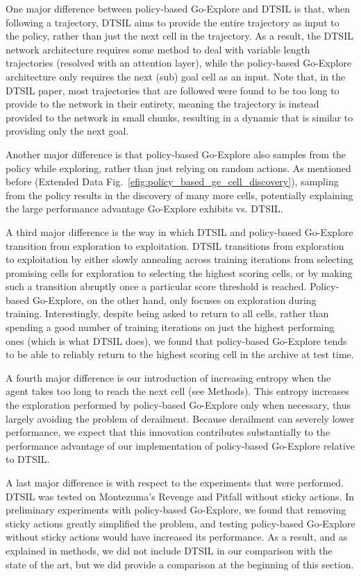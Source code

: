 \documentclass{nature}
\begin{document}
One major difference between policy-based Go-Explore and DTSIL is that, when following a trajectory, DTSIL aims to provide the entire trajectory as input to the policy, rather than just the next cell in the trajectory.
As a result, the DTSIL network architecture requires some method to deal with variable length trajectories (resolved with an attention layer), while the policy-based Go-Explore architecture only requires the next (sub) goal cell as an input.
Note that, in the DTSIL paper, most trajectories that are followed were found to be too long to provide to the network in their entirety, meaning the trajectory is instead provided to the network in small chunks, resulting in a dynamic that is similar to providing only the next goal.

Another major difference is that policy-based Go-Explore also samples from the policy while exploring, rather than just relying on random actions.
As mentioned before (Extended Data Fig.~\ref{efig:policy_based_ge_cell_discovery}), sampling from the policy results in the discovery of many more cells, potentially explaining the large performance advantage Go-Explore exhibits vs. DTSIL.

A third major difference is the way in which DTSIL and policy-based Go-Explore transition from exploration to exploitation. 
DTSIL transitions from exploration to exploitation by either slowly annealing across training iterations from selecting promising cells for exploration to selecting the highest scoring cells, or by making such a transition abruptly once a particular score threshold is reached.
Policy-based Go-Explore, on the other hand, only focuses on exploration during training. 
Interestingly, despite being asked to return to all cells, rather than spending a good number of training iterations on just the highest performing ones (which is what DTSIL does),
we found that policy-based Go-Explore tends to be able to reliably return to the highest scoring cell in the archive at test time.

A fourth major difference is our introduction of increasing entropy when the agent takes too long to reach the next cell (see Methods).
This entropy increases the exploration performed by policy-based Go-Explore only when necessary, thus largely avoiding the problem of derailment.
Because derailment can severely lower performance, we expect that this innovation contributes substantially to the performance advantage of our implementation of policy-based Go-Explore relative to DTSIL.


A last major difference is with respect to the experiments that were performed. 
DTSIL was tested on Montezuma's Revenge and Pitfall without sticky actions.
In preliminary experiments with policy-based Go-Explore, we found that removing sticky actions greatly simplified the problem, and testing policy-based Go-Explore without sticky actions would have increased its performance.
As a result, and as explained in methods, we did not include DTSIL in our comparison with the state of the art, but we did provide a comparison at the beginning of this section.
\end{document}
